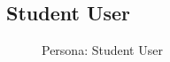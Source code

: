 \documentclass[12pt]{report}
\begin{document}
\subsection{Student User}
\begin{figure}[!htb]
	\caption{\label{fig:student_user}Persona: Student User}
\end{figure}

\FloatBarrier
\end{document}
